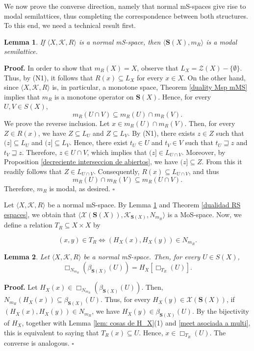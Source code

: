 \documentclass{article}
\newtheorem{lemma}{\bf Lemma}[section]
\newenvironment{proof}
{\par\noindent\textbf{Proof. }\rm}
{\hfill$\boldsymbol{\square}$\par\vspace{0.3cm}}
\begin{document}
We now prove the converse direction, namely that normal mS-spaces give rise to modal semilattices, thus completing the correspondence between both structures. To this end, we need a technical result first.

\begin{lemma}\label{lem: normal to modal}
If $\langle X, \mathcal{K}, R \rangle$ is a normal mS-space, then $\langle \mathbf{S}(X), m_R\rangle$ is a modal semilattice.   
\end{lemma}
\begin{proof}
In order to show that $m_R(X)=X$, observe that $L_X=\mathcal{Z}(X)-\{\emptyset\}$. Thus, by (N1), it follows that $R(x)\subseteq L_X$ for every $x\in X$. On the other hand, since $\langle X, \mathcal{K}, R \rangle$ is, in particular, a monotone space, Theorem \ref{duality Msp mMS} implies that $m_R$ is a monotone operator on $\mathbf{S}(X)$. Hence, for every $U,V\in S(X)$,
\[
m_R(U\cap V)\subseteq m_R(U)\cap m_R(V).
\]
We prove the reverse inclusion. Let $x\in m_R(U)\cap m_R(V)$. Then, for every $Z\in R(x)$, we have $Z\subseteq L_U$ and $Z\subseteq L_V$. By (N1), there exists $z\in Z$ such that $(z]\subseteq L_U$ and $(z]\subseteq L_V$. Hence, there exist $t_U\in U$ and $t_V\in V$ such that $t_U\sqsupseteq z$ and $t_V\sqsupseteq z$. Therefore, $z\in U\cap V$, which implies that $(z]\in L_{U\cap V}$. Moreover, by Proposition \ref{decreciente interseccion de abiertos}, we have $(z]\subseteq Z$. From this it readily follows that $Z\in L_{U\cap V}$. Consequently, $R(x)\subseteq L_{U\cap V}$, and thus
\[
m_R(U)\cap m_R(V)\subseteq m_R(U\cap V).
\]
Therefore, $m_R$ is modal, as desired.
\end{proof}

 
Let $\langle X, \mathcal{K}, R \rangle$ be a normal mS-space. By Lemma \ref{lem: normal to modal} and Theorem \ref{dualidad RS espaces}, we obtain that $\langle \mathcal{X}(\mathbf{S}(X)), \mathcal{K}_{\mathbf{S}(X)}, N_{m_R}\rangle$ is a MoS-space.  
Now, we define a relation $T_R \subseteq X \times X$ by

\begin{equation}\label{meet asociada a multi}
(x, y) \in T_R \iff (H_X(x),H_X (y)) \in N_{m_R}.
\end{equation}

\begin{lemma}\label{lem: otras cosas de H_X}
Let $\langle X, \mathcal{K}, R \rangle$ be a normal mS-space. Then, for every $U\in S(X)$,
\[\Box_{N_{m_R}}(\beta_{\mathbf{S}(X)}(U))= H_X[\Box_{T_R}(U)].
\]
\end{lemma}
\begin{proof}
Let $H_X(x)\in \Box_{N_{m_R}}(\beta_{\mathbf{S}(X)}(U))$. Then, $N_{m_R}(H_X(x))\subseteq \beta_{\mathbf{S}(X)}(U)$. Thus, for every $H_X(y)\in \mathcal{X}(\mathbf{S}(X))$, if $(H_X(x), H_X(y))\in N_{m_R}$, we have $H_X(y)\in \beta_{\mathbf{S}(X)}(U)$. By the bijectivity of $H_X$, together with Lemma \ref{lem: cosas de H_X}(1) and \eqref{meet asociada a multi}, this is equivalent to saying that $T_R(x)\subseteq U$. Hence, $x\in \Box_{T_R}(U)$. The converse is analogous.
\end{proof}
\end{document}
